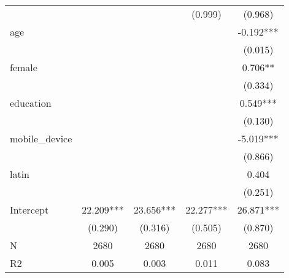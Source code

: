 \begin{table}
\begin{center}
\begin{tabular}{lcccc}
                               &                 &                  & (0.999)           & (0.968)             \\
age                            &                 &                  &                   & -0.192***           \\
                               &                 &                  &                   & (0.015)             \\
female                         &                 &                  &                   & 0.706**             \\
                               &                 &                  &                   & (0.334)             \\
education                      &                 &                  &                   & 0.549***            \\
                               &                 &                  &                   & (0.130)             \\
mobile\_device                 &                 &                  &                   & -5.019***           \\
                               &                 &                  &                   & (0.866)             \\
latin                          &                 &                  &                   & 0.404               \\
                               &                 &                  &                   & (0.251)             \\
Intercept                      & 22.209***       & 23.656***        & 22.277***         & 26.871***           \\
                               & (0.290)         & (0.316)          & (0.505)           & (0.870)             \\
N                              & 2680            & 2680             & 2680              & 2680                \\
R2                             & 0.005           & 0.003            & 0.011             & 0.083               \\
\hline
\end{tabular}
\end{center}
\end{table}
